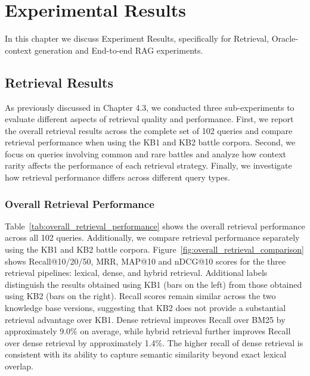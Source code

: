 \chapter{Experimental Results}
In this chapter we discuss Experiment Results, specifically for Retrieval, Oracle-context generation and End-to-end RAG experiments. 
\section{Retrieval Results}
As previously discussed in Chapter 4.3, we conducted three sub-experiments to evaluate different aspects of retrieval quality and performance. First, we report the overall retrieval results across the complete set of 102 queries and compare retrieval performance when using the KB1 and KB2 battle corpora. Second, we focus on queries involving common and rare battles and analyze how context rarity affects the performance of each retrieval strategy. Finally, we investigate how retrieval performance differs across different query types.
\subsection{Overall Retrieval Performance}
Table~\ref{tab:overall_retrieval_performance} shows the overall retrieval performance across all 102 queries. Additionally, we compare retrieval performance separately using the KB1 and KB2 battle corpora. Figure~\ref{fig:overall_retrieval_comparison} shows Recall@10/20/50, MRR, MAP@10 and nDCG@10 scores for the three retrieval pipelines: lexical, dense, and hybrid retrieval. Additional labels distinguish the results obtained using KB1 (bars on the left) from those obtained using KB2 (bars on the right). Recall scores remain similar across the two knowledge base versions, suggesting that KB2 does not provide a substantial retrieval advantage over KB1. Dense retrieval improves Recall over BM25 by approximately 9.0\% on average, while hybrid retrieval further improves Recall over dense retrieval by approximately 1.4\%. The higher recall of dense retrieval is consistent with its ability to capture semantic similarity beyond exact lexical overlap. 

